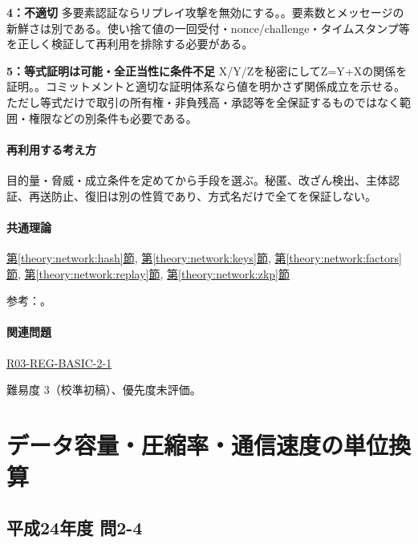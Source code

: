 \noindent\textbf{4：不適切} 多要素認証ならリプレイ攻撃を無効にする。。要素数とメッセージの新鮮さは別である。使い捨て値の一回受付・nonce/challenge・タイムスタンプ等を正しく検証して再利用を排除する必要がある。\par

\noindent\textbf{5：等式証明は可能・全正当性に条件不足} X/Y/Zを秘密にしてZ=\allowbreak{}Y+Xの関係を証明。。コミットメントと適切な証明体系なら値を明かさず関係成立を示せる。ただし等式だけで取引の所有権・非負残高・承認等を全保証するものではなく範囲・権限などの別条件も必要である。\par

\paragraph{再利用する考え方} 目的量・脅威・成立条件を定めてから手段を選ぶ。秘匿、改ざん検出、主体認証、再送防止、復旧は別の性質であり、方式名だけで全てを保証しない。

\paragraph{共通理論} \hyperref[theory:network:hash]{第\ref*{theory:network:hash}節}, \hyperref[theory:network:keys]{第\ref*{theory:network:keys}節}, \hyperref[theory:network:factors]{第\ref*{theory:network:factors}節}, \hyperref[theory:network:replay]{第\ref*{theory:network:replay}節}, \hyperref[theory:network:zkp]{第\ref*{theory:network:zkp}節}

\par 参考：\cite{net_hash,net_nist2017,net_signature,net_pq2024,net_pq2022,net_zkp2021}。

\paragraph{関連問題} \hyperref[q:r03-reg-basic-2-1]{R03-REG-BASIC-2-1}

\par 難易度 3（校準初稿）、優先度未評価。

\section{データ容量・圧縮率・通信速度の単位換算}

\subsection{平成24年度 問2-4}
\label{q:h24-reg-basic-2-4}

